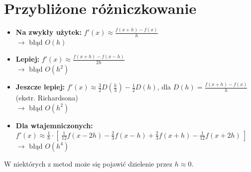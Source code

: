 \section{Przybliżone różniczkowanie}
\begin{itemize}
    \item \textbf{Na zwykły użytek:} \( f'(x) \approx \frac{f(x+h) - f(x)}{h} \) \\
    \( \rightarrow \) błąd \( O(h) \)
    \item \textbf{Lepiej:} \( f'(x) \approx \frac{f(x+h) - f(x-h)}{2h} \) \\
    \( \rightarrow \) błąd \( O(h^2) \)
    \item \textbf{Jeszcze lepiej:} \( f'(x) \approx \frac{3}{2}D\!\left(\frac{h}{3}\right) - \frac{1}{2}D(h) \), dla \( D(h) = \frac{f(x+h) - f(x)}{h} \) \quad (ekstr. Richardsona) \\
    \( \rightarrow \) błąd \( O(h^2) \)
    \item \textbf{Dla wtajemniczonych:} \( f'(x) \approx \frac{1}{h} \cdot \left[\: \frac{1}{12}f(x-2h) - \frac{2}{3}f(x-h) + \frac{2}{3}f(x+h) - \frac{1}{12}f(x+2h) \:\right] \) \\
    \( \rightarrow \) błąd \( O(h^4) \)
\end{itemize}

W niektórych z metod może się pojawić dzielenie przez \( h \approx 0 \).